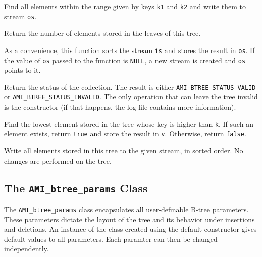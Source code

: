     {Find all elements within the range given by
   keys \lstinline|k1| and \lstinline|k2| and write them to stream \lstinline|os|.}

  \etabb
  
  \clearpage

  \btabb

    {Return the number of elements
   stored in the leaves of this tree.}

    {As a convenience, this function sorts the
   stream \lstinline|is| and stores the result in \lstinline|os|. If the value of \lstinline|os| passed to the function is \lstinline|NULL|, a new stream is created and
   \lstinline|os| points to it.}

    {Return the status
   of the collection. The result is either
   \lstinline|AMI_BTREE_STATUS_VALID| or
   \lstinline|AMI_BTREE_STATUS_INVALID|. The only operation that can leave
   the tree invalid is the constructor (if that happens, the log file
   contains more information).}

    {Find the lowest
   element stored in the tree whose key is higher than \lstinline|k|. If such
   an element exists, return \lstinline|true| and store the result in
   \lstinline|v|. Otherwise, return \lstinline|false|.}

    {Write all
   elements stored in this tree to the given stream, in sorted order. No
   changes are performed on the tree.}

\etabb

\subsection{The \texttt{AMI\_btree\_params} Class}\label{ssec:params}
The \lstinline|AMI_btree_params| class encapsulates all user-definable B-tree
parameters. These parameters dictate the layout of the tree and its
behavior under insertions and deletions. An instance of the class created
using the default constructor gives default values to all parameters. Each
paramter can then be changed independently.

